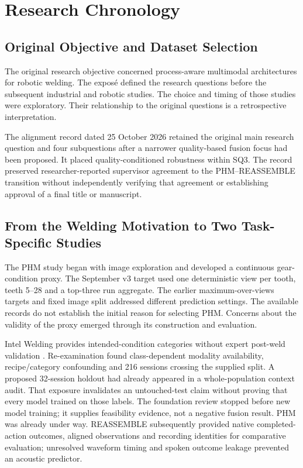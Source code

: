 \chapter{Research Chronology}
\label{app:chronology}
\section{Original Objective and Dataset Selection}
The original research objective concerned process-aware multimodal architectures for
robotic welding. The exposé defined the research questions before the subsequent
industrial and robotic studies. The choice and timing of those studies were exploratory.
Their relationship to the original questions is a retrospective
interpretation.

The alignment record dated 25 October 2026 retained the original main research question
and four subquestions after a narrower quality-based fusion focus had been proposed. It
placed quality-conditioned robustness within SQ3. The record preserved
researcher-reported supervisor agreement to the PHM--REASSEMBLE transition without
independently verifying that agreement or establishing approval of a final title or
manuscript.

\section{From the Welding Motivation to Two Task-Specific Studies}
The PHM study began with image exploration and developed a continuous gear-condition
proxy. The September v3 target used one deterministic view per tooth, teeth 5--28 and a
top-three run aggregate. The earlier maximum-over-views targets and fixed image split
addressed different prediction settings. The available records do not establish the
initial reason for selecting PHM. Concerns about the validity of the proxy emerged
through its construction and evaluation.

Intel Welding provides intended-condition categories without expert post-weld validation
\parencite{Stemmer2024Welding,IntelWeldingHF2024}. Re-examination found class-dependent
modality availability, recipe/category confounding and 216 sessions crossing the supplied
split. A proposed 32-session holdout
had already appeared in a whole-population context audit. That exposure invalidates an
untouched-test claim without proving that every model trained on those labels. The
foundation review stopped before new model training; it supplies feasibility evidence,
not a negative fusion result. PHM was already under way. REASSEMBLE subsequently
provided native completed-action outcomes, aligned observations and recording identities
for comparative evaluation; unresolved waveform timing and spoken outcome leakage
prevented an acoustic predictor.

